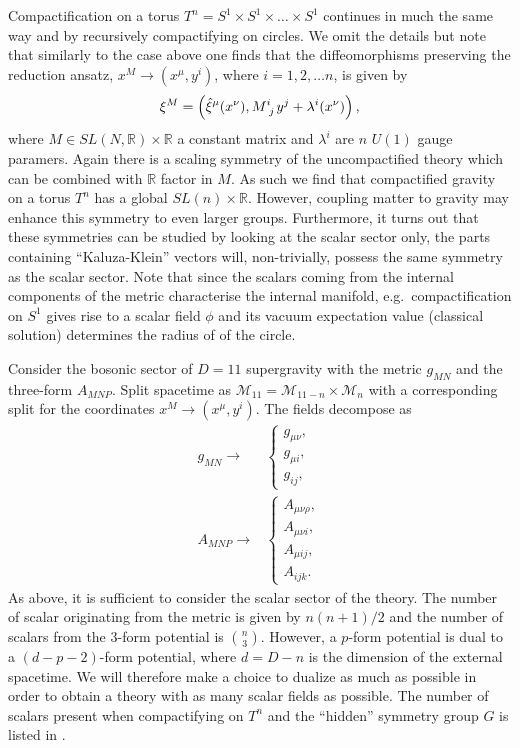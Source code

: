 Compactification on a torus $T^n=S^1\times S^1\times\ldots\times S^1$ continues in much the same way and by recursively compactifying on circles. We omit the details but note that similarly to the case above one finds that the diffeomorphisms preserving the reduction ansatz, $x^M\to (x^\mu,y^i)$, where $i=1,2,\ldots n$, is given by 
\begin{equation}
    \xi^M = \left(\hat{\xi}^\mu(x^\nu),\tensor{M}{^i_j}y^j+\lambda^i(x^\nu)\right),
\end{equation}
where $M\in SL(N,\mathbb{R})\times \mathbb{R}$ a constant matrix and $\lambda^i$ are $n$ $U(1)$ gauge paramers. Again there is a scaling symmetry of the uncompactified theory which can be combined with $\mathbb{R}$ factor in $M$. As such we find that compactified gravity on a torus $T^n$ has a global $SL(n)\times\mathbb{R}$. However, coupling matter to gravity may enhance this symmetry to even larger groups. Furthermore, it turns out that these symmetries can be studied by looking at the scalar sector only, the parts containing ``Kaluza-Klein'' vectors will, non-trivially, possess the same symmetry as the scalar sector. Note that since the scalars coming from the internal components of the metric characterise the internal manifold, e.g.\ compactification on $S^1$ gives rise to a scalar field $\phi$ and its vacuum expectation value (classical solution) determines the radius of of the circle.

Consider the bosonic sector of $D=11$ supergravity with the metric $g_{MN}$ and the three-form $A_{MNP}$. Split spacetime as $\mathcal{M}_{11}=\mathcal{M}_{11-n}\times\mathcal{M}_n$ with a corresponding split for the coordinates $x^M\to (x^\mu,y^i)$. The fields decompose as 
\begin{align}
        g_{MN}\to &\begin{cases}g_{\mu\nu},\\g_{\mu i},\\g_{ij},\end{cases}\\
        A_{MNP}\to &\begin{cases}A_{\mu\nu\rho},\\A_{\mu\nu i},\\A_{\mu ij},\\A_{ijk}.\end{cases}
\end{align}
As above, it is sufficient to consider the scalar sector of the theory. The number of scalar originating from the metric is given by $n(n+1)/2$ and the number of scalars from the $3$-form potential is ${n}\choose{3}$. However, a $p$-form potential is dual to a $(d-p-2)$-form potential, where $d=D-n$ is the dimension of the external spacetime. We will therefore make a choice to dualize as much as possible in order to obtain a theory with as many scalar fields as possible. The number of scalars present when compactifying on $T^n$ and the ``hidden'' symmetry group $G$ is listed in .


